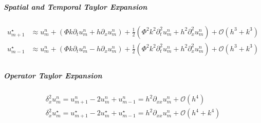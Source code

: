\subparagraph{Spatial and Temporal Taylor Expansion}
\begin{align*}
  u_{m+1}^\star & \approx u_m^n + \left(\Phi k \partial_t u_m^n + h \partial_x u_m^n\right) + \frac{1}{2}\left(\Phi^2 k^2 \partial_t^2 u_m^n + h^2 \partial_x^2 u_m^n\right) + \mathcal{O}(h^3 + k^3) \\
  u_{m-1}^\star & \approx u_m^n + \left(\Phi k \partial_t u_m^n - h \partial_x u_m^n\right) + \frac{1}{2}\left(\Phi^2 k^2 \partial_t^2 u_m^n + h^2 \partial_x^2 u_m^n\right) + \mathcal{O}(h^3 + k^3) \\
\end{align*}
\subparagraph{Operator Taylor Expansion}
\begin{align*}
  \delta_x^2 u_m^n = u_{m+1}^n - 2u_m^n + u_{m-1}^n = h^2\partial_{xx}u_m^n + \mathcal{O}(h^4) \\
  \delta_x^2 u_m^\star = u_{m+1}^\star - 2u_m^\star + u_{m-1}^\star = h^2\partial_{xx}u_m^n + \mathcal{O}(h^4 + k^4) \\
\end{align*}

